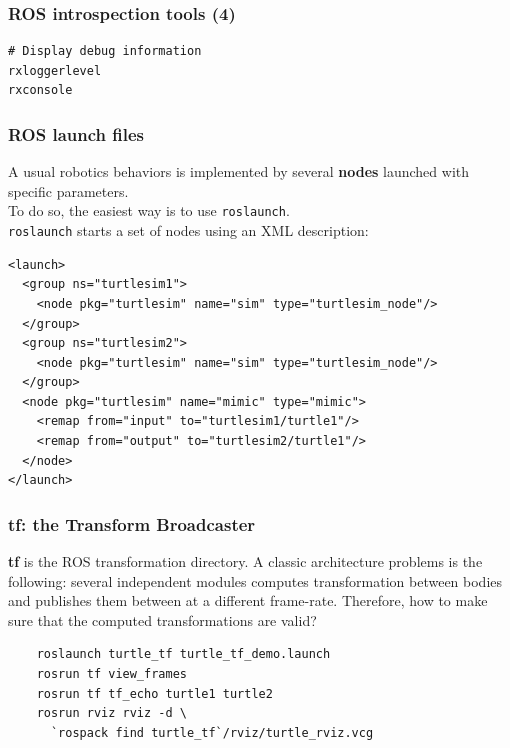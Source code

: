 \documentclass[hyperref={pdfpagelabels=false}]{beamer}
\newenvironment{changemargin}[2]{%
\begin{list}{}{%
\setlength{\topsep}{0pt}%
\setlength{\leftmargin}{#1}%
\setlength{\rightmargin}{#2}%
\setlength{\listparindent}{\parindent}%
\setlength{\itemindent}{\parindent}%
\setlength{\parsep}{\parskip}%
}%
\item[]}{\end{list}}
\begin{document}
\begin{frame}[fragile]
  \frametitle{ROS introspection tools (4)}

\begin{verbatim}
# Display debug information
rxloggerlevel
rxconsole
\end{verbatim}
\end{frame}

\begin{frame}[fragile]
  \frametitle{ROS launch files}

  A usual robotics behaviors is implemented by several \textbf{nodes}
  launched with specific parameters.\\
  \vspace{0.1cm}
  To do so, the easiest way is to use \texttt{roslaunch}.\\
  \vspace{0.1cm}
  \texttt{roslaunch} starts a set of nodes using an XML description:\\

\begin{changemargin}{0cm}{0cm}
  \vspace{0.2cm}
\footnotesize
  \begin{verbatim}
<launch>
  <group ns="turtlesim1">
    <node pkg="turtlesim" name="sim" type="turtlesim_node"/>
  </group>
  <group ns="turtlesim2">
    <node pkg="turtlesim" name="sim" type="turtlesim_node"/>
  </group>
  <node pkg="turtlesim" name="mimic" type="mimic">
    <remap from="input" to="turtlesim1/turtle1"/>
    <remap from="output" to="turtlesim2/turtle1"/>
  </node>
</launch>
  \end{verbatim}
\end{changemargin}
\end{frame}

\begin{frame}[fragile]
  \frametitle{tf: the Transform Broadcaster}

  \textbf{tf} is the ROS transformation directory. A classic
  architecture problems is the following: several independent modules
  computes transformation between bodies and publishes them between at
  a different frame-rate. Therefore, how to make sure that the
  computed transformations are valid?

  \begin{verbatim}
    roslaunch turtle_tf turtle_tf_demo.launch
    rosrun tf view_frames
    rosrun tf tf_echo turtle1 turtle2
    rosrun rviz rviz -d \
      `rospack find turtle_tf`/rviz/turtle_rviz.vcg
  \end{verbatim}

\end{frame}
\end{document}
